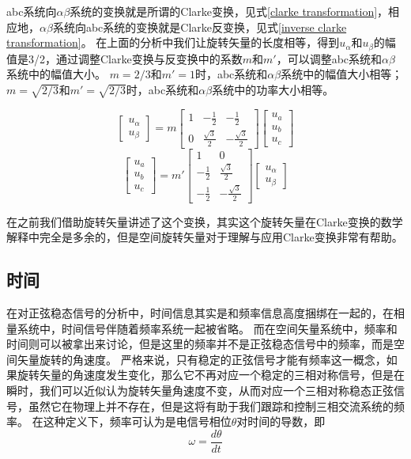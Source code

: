 \documentclass{ctexart}
\numberwithin{equation}{section}
\begin{document}
abc系统向$\alpha \beta$系统的变换就是所谓的Clarke变换，见式\ref{clarke transformation}，相应地，$\alpha \beta$系统向abc系统的变换就是Clarke反变换，见式\ref{inverse clarke transformation}。
在上面的分析中我们让旋转矢量的长度相等，得到${u_{\alpha}}$和${u_{\beta}}$的幅值是3/2，通过调整Clarke变换与反变换中的系数$m$和$m'$，可以调整abc系统和$\alpha \beta$系统中的幅值大小。
$m=2/3$和$m'=1$时，abc系统和$\alpha \beta$系统中的幅值大小相等；$m=\sqrt{2/3}$和$m'=\sqrt{2/3}$时，abc系统和$\alpha \beta$系统中的功率大小相等。

\begin{equation}
  \begin{bmatrix}
    u_{\alpha}\\
    u_{\beta}
  \end{bmatrix}
  =
  m
  \begin{bmatrix}
    1 & -\frac{1}{2} & -\frac{1}{2}\\
    0 & \frac{\sqrt{3}}{2} & -\frac{\sqrt{3}}{2}
  \end{bmatrix}
  \begin{bmatrix}
    u_a\\
    u_b\\
    u_c
  \end{bmatrix}
  \label{clarke transformation}
\end{equation}
\begin{equation}
  \begin{bmatrix}
    u_a\\
    u_b\\
    u_c
  \end{bmatrix}
  =
  m'
  \begin{bmatrix}
    1 & 0\\
    -\frac{1}{2} & \frac{\sqrt{3}}{2}\\
    -\frac{1}{2} & -\frac{\sqrt{3}}{2}
  \end{bmatrix}
  \begin{bmatrix}
    u_{\alpha}\\
    u_{\beta}
  \end{bmatrix}
  \label{inverse clarke transformation}
\end{equation}

在之前我们借助旋转矢量讲述了这个变换，其实这个旋转矢量在Clarke变换的数学解释中完全是多余的，但是空间旋转矢量对于理解与应用Clarke变换非常有帮助。

\subsection{时间}
在对正弦稳态信号的分析中，时间信息其实是和频率信息高度捆绑在一起的，在相量系统中，时间信号伴随着频率系统一起被省略。
而在空间矢量系统中，频率和时间则可以被拿出来讨论，但是这里的频率并不是正弦稳态信号中的频率，而是空间矢量旋转的角速度。
严格来说，只有稳定的正弦信号才能有频率这一概念，如果旋转矢量的角速度发生变化，那么它不再对应一个稳定的三相对称信号，但是在瞬时，我们可以近似认为旋转矢量角速度不变，从而对应一个三相对称稳态正弦信号，虽然它在物理上并不存在，但是这将有助于我们跟踪和控制三相交流系统的频率。
在这种定义下，频率可认为是电信号相位$\theta$对时间的导数，即
\begin{equation}
  \omega = \frac{d\theta}{dt}
\end{equation}
\end{document}

